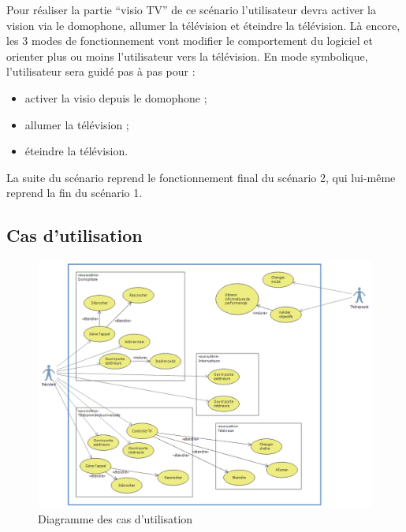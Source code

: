Pour réaliser la partie \enquote{visio TV} de ce scénario l'utilisateur devra activer la vision via le domophone, allumer la télévision et éteindre la télévision. Là encore, les 3 modes de fonctionnement vont modifier le comportement du logiciel et orienter plus ou moins l'utilisateur vers la télévision. En mode symbolique, l'utilisateur sera guidé pas à pas pour :
\begin{itemize}
	\item activer la visio depuis le domophone ;
	\item allumer la télévision ;
	\item éteindre la télévision.
\end{itemize}
La suite du scénario reprend le fonctionnement final du scénario 2, qui lui-même reprend la fin du scénario 1.

\subsection{Cas d'utilisation}
\begin{figure}[h]
  \caption{Diagramme des cas d'utilisation}
  \includegraphics[width=\textwidth]{1-PreEtude/img/diagramme}
\end{figure}
